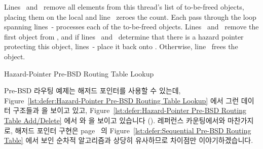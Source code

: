 \begin{lineref}
Lines~ and~
remove all elements from this thread's list of
to-be-freed objects, placing them on the local 
and line~ zeroes the count.
Each pass through the loop spanning
lines~- processes each
of the to-be-freed objects.
Lines~ and~
remove the first object from ,
and if lines~ and~
determine that there is a hazard pointer
protecting this object, lines~-
place it back onto .
Otherwise, line~ frees the object.
\fi
\end{lineref}

\begin{listing}[tbp]

\caption{Hazard-Pointer Pre-BSD Routing Table Lookup}
\label{lst:defer:Hazard-Pointer Pre-BSD Routing Table Lookup}
\end{listing}

Pre-BSD 라우팅 예제는 해저드 포인터를 사용할 수 있는데,
Figure~\ref{lst:defer:Hazard-Pointer Pre-BSD Routing Table Lookup}
에서 그런 데이터 구조들과  을 보이고 있고,
Figure~\ref{lst:defer:Hazard-Pointer Pre-BSD Routing Table Add/Delete}
에서  와  을 보이고 있습니다
().
레퍼런스 카운팅에서와 마찬가지로, 해저드 포인터 구현은
page~\pageref{lst:defer:Sequential Pre-BSD Routing Table} 의
Figure~\ref{lst:defer:Sequential Pre-BSD Routing Table} 에서 보인 순차적
알고리즘과 상당히 유사하므로 차이점만 이야기하겠습니다.

